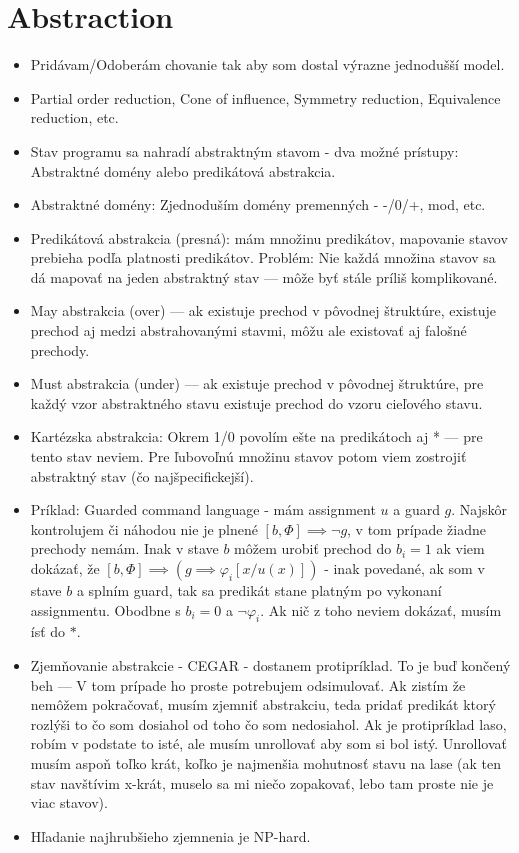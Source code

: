 \documentclass[paper=a4, fontsize=11pt]{scrartcl} %
\numberwithin{equation}{section} %
\numberwithin{figure}{section} %
\numberwithin{table}{section} %
\begin{document}
	\section{Abstraction}
	
	\begin{itemize}
		\item Pridávam/Odoberám chovanie tak aby som dostal výrazne jednodušší model.
		\item Partial order reduction, Cone of influence, Symmetry reduction, Equivalence reduction, etc.
		\item Stav programu sa nahradí abstraktným stavom - dva možné prístupy: Abstraktné domény alebo predikátová abstrakcia. 
		\item Abstraktné domény: Zjednoduším domény premenných - -/0/+, mod, etc.
		\item Predikátová abstrakcia (presná): mám množinu predikátov, mapovanie stavov prebieha podľa platnosti predikátov. Problém: Nie každá množina stavov sa dá mapovať na jeden abstraktný stav — môže byť stále príliš komplikované.
		\item May abstrakcia (over) — ak existuje prechod v pôvodnej štruktúre, existuje prechod aj medzi abstrahovanými stavmi, môžu ale existovať aj falošné prechody. 
		\item Must abstrakcia (under) — ak existuje prechod v pôvodnej štruktúre, pre každý vzor abstraktného stavu existuje prechod do vzoru cieľového stavu. 
		\item Kartézska abstrakcia: Okrem 1/0 povolím ešte na predikátoch aj * — pre tento stav neviem. Pre ľubovoľnú množinu stavov potom viem zostrojiť abstraktný stav (čo najšpecifickejší).
		
		\item Príklad: Guarded command language - mám assignment $u$ a guard $g$. Najskôr kontrolujem či náhodou nie je plnené $[b, \Phi] \implies \neg g$, v tom prípade žiadne prechody nemám. Inak v stave $b$ môžem urobiť prechod do $b_i = 1$ ak viem dokázať, že $[b, \Phi] \implies (g \implies \varphi_i[x/u(x)])$ - inak povedané, ak som v stave $b$ a splním guard, tak sa predikát stane platným po vykonaní assignmentu. Obodbne s $b_i = 0$ a $\neg \varphi_i$. Ak nič z toho neviem dokázať, musím ísť do $*$.
		
		\item Zjemňovanie abstrakcie - CEGAR - dostanem protipríklad. To je buď končený beh — V tom prípade ho proste potrebujem odsimulovať. Ak zistím že nemôžem pokračovať, musím zjemniť abstrakciu, teda pridať predikát ktorý rozlýši to čo som dosiahol od toho čo som nedosiahol. Ak je protipríklad laso, robím v podstate to isté, ale musím unrollovať aby som si bol istý. Unrollovať musím aspoň toľko krát, koľko je najmenšia mohutnosť stavu na lase (ak ten stav navštívim x-krát, muselo sa mi niečo zopakovať, lebo tam proste nie je viac stavov).
		
		\item Hľadanie najhrubšieho zjemnenia je NP-hard.
	\end{itemize}
\end{document}
